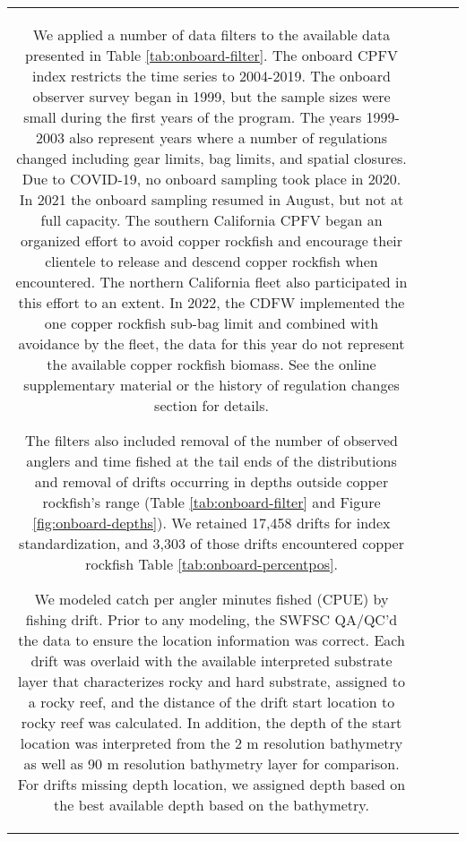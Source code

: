 \documentclass[11pt,
  letterpaper,
]{article}
\begin{document}
\begin{longtable}[t]{c>{\centering\arraybackslash}p{2cm}>{\centering\arraybackslash}p{2cm}>{\centering\arraybackslash}p{2cm}}
We applied a number of data filters to the available data presented in Table \ref{tab:onboard-filter}. The onboard CPFV index restricts the time series to 2004-2019. The onboard observer survey began in 1999, but the sample sizes were small during the first years of the program. The years 1999-2003 also represent years where a number of regulations changed including gear limits, bag limits, and spatial closures. Due to COVID-19, no onboard sampling took place in 2020. In 2021 the onboard sampling resumed in August, but not at full capacity. The southern California CPFV began an organized effort to avoid copper rockfish and encourage their clientele to release and descend copper rockfish when encountered. The northern California fleet also participated in this effort to an extent. In 2022, the CDFW implemented the one copper rockfish sub-bag limit and combined with avoidance by the fleet, the data for this year do not represent the available copper rockfish biomass. See the online supplementary material or the history of regulation changes section for details.

The filters also included removal of the number of observed anglers and time fished at the tail ends of the distributions and removal of drifts occurring in depths outside copper rockfish's range (Table \ref{tab:onboard-filter} and Figure \ref{fig:onboard-depths}). We retained 17,458 drifts for index standardization, and 3,303 of those drifts encountered copper rockfish Table \ref{tab:onboard-percentpos}.

We modeled catch per angler minutes fished (CPUE) by fishing drift. Prior to any modeling, the SWFSC QA/QC'd the data to ensure the location information was correct. Each drift was overlaid with the available interpreted substrate layer that characterizes rocky and hard substrate, assigned to a rocky reef, and the distance of the drift start location to rocky reef was calculated. In addition, the depth of the start location was interpreted from the 2 m resolution bathymetry as well as 90 m resolution bathymetry layer for comparison. For drifts missing depth location, we assigned depth based on the best available depth based on the bathymetry.


\end{longtable}
\end{document}
